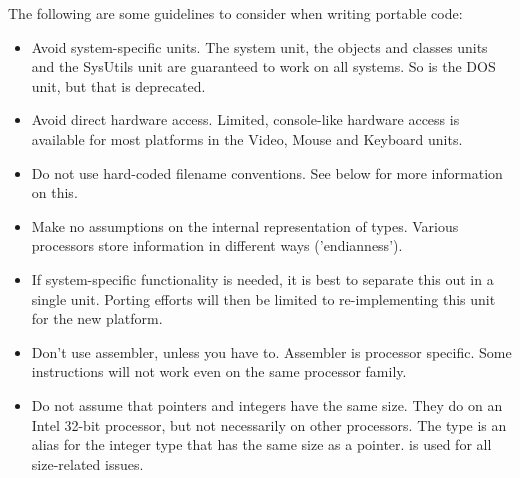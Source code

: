 The following are some guidelines to consider when writing portable code:
\begin{itemize}
\item Avoid system-specific units. The system unit, the objects and
classes units and the SysUtils unit are guaranteed to work on all
systems. So is the DOS unit, but that is deprecated.
\item Avoid direct hardware access. Limited, console-like hardware
access is available for most platforms in the Video, Mouse and
Keyboard units.
\item Do not use hard-coded filename conventions.
See below for more information on this.
\item Make no assumptions on the internal representation of types. Various
processors store information in different ways ('endianness').
\item If system-specific functionality is needed, it is best to
separate this out in a single unit. Porting efforts will then be
limited to re-implementing this unit for the new platform.
\item Don't use assembler, unless you have to. Assembler is processor
specific. Some instructions will not work even on the same processor family.
\item Do not assume that pointers and integers have the same size. They do
on an Intel 32-bit processor, but not necessarily on other processors.
The  type is an alias for the integer type that has the same
size as a pointer.  is used for all size-related issues.
\end{itemize}

